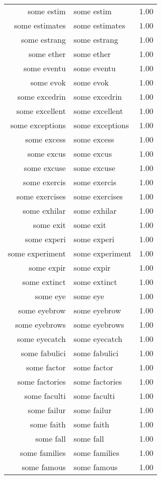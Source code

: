 \begin{table}[ht]
\begin{tabular}{rlr}
  some estim & some estim & 1.00 \\ 
  some estimates & some estimates & 1.00 \\ 
  some estrang & some estrang & 1.00 \\ 
  some ether & some ether & 1.00 \\ 
  some eventu & some eventu & 1.00 \\ 
  some evok & some evok & 1.00 \\ 
  some excedrin & some excedrin & 1.00 \\ 
  some excellent & some excellent & 1.00 \\ 
  some exceptions & some exceptions & 1.00 \\ 
  some excess & some excess & 1.00 \\ 
  some excus & some excus & 1.00 \\ 
  some excuse & some excuse & 1.00 \\ 
  some exercis & some exercis & 1.00 \\ 
  some exercises & some exercises & 1.00 \\ 
  some exhilar & some exhilar & 1.00 \\ 
  some exit & some exit & 1.00 \\ 
  some experi & some experi & 1.00 \\ 
  some experiment & some experiment & 1.00 \\ 
  some expir & some expir & 1.00 \\ 
  some extinct & some extinct & 1.00 \\ 
  some eye & some eye & 1.00 \\ 
  some eyebrow & some eyebrow & 1.00 \\ 
  some eyebrows & some eyebrows & 1.00 \\ 
  some eyecatch & some eyecatch & 1.00 \\ 
  some fabulici & some fabulici & 1.00 \\ 
  some factor & some factor & 1.00 \\ 
  some factories & some factories & 1.00 \\ 
  some faculti & some faculti & 1.00 \\ 
  some failur & some failur & 1.00 \\ 
  some faith & some faith & 1.00 \\ 
  some fall & some fall & 1.00 \\ 
  some families & some families & 1.00 \\ 
  some famous & some famous & 1.00 \\ 

\end{tabular}
\end{table}
